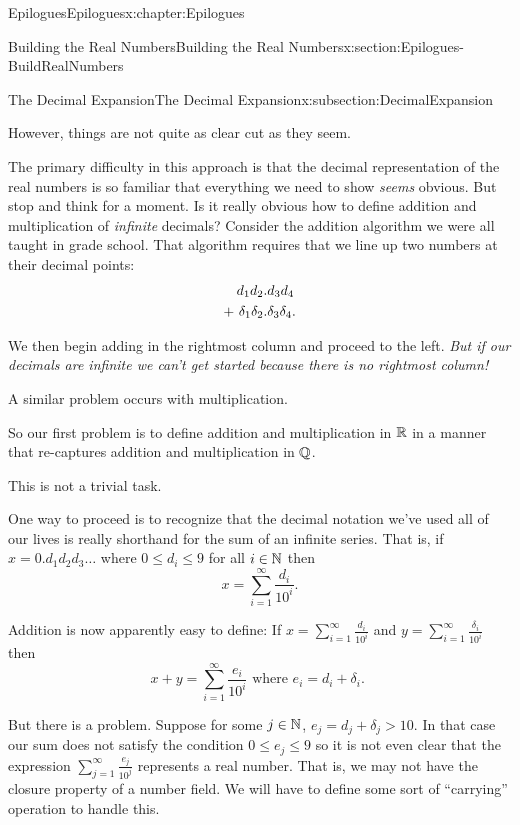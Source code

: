 \begin{chapterptx}{Epilogues}{}{Epilogues}{}{}{x:chapter:Epilogues}
\begin{sectionptx}{Building the Real Numbers}{}{Building the Real Numbers}{}{}{x:section:Epilogues-BuildRealNumbers}
\begin{subsectionptx}{The Decimal Expansion}{}{The Decimal Expansion}{}{}{x:subsection:DecimalExpansion}
			\par
			However, things are not quite as clear cut as they seem.%
			\par
			The primary difficulty in this approach is that the decimal representation of the real numbers is so familiar that everything we need to show \emph{seems} obvious. But stop and think for a moment. Is it really obvious how to define addition and multiplication of \emph{infinite} decimals? Consider the addition algorithm we were all taught in grade school. That algorithm requires that we line up two numbers at their decimal points:%
			\begin{align*}
				d_1d_2& .d_3d_4\\
				+\   \delta_1\delta_2& .\delta_3\delta_4\text{.}
			\end{align*}
			\par
			We then begin adding in the rightmost column and proceed to the left. \emph{But if our decimals are infinite we can't get started because there is no rightmost column!}%
			\par
			A similar problem occurs with multiplication.%
			\par
			So our first problem is to define addition and multiplication in \(\mathbb {R}\) in a manner that re-captures addition and multiplication in \(\mathbb {Q}\).%
			\par
			This is not a trivial task.%
			\par
			One way to proceed is to recognize that the decimal notation we've used all of our lives is really shorthand for the sum of an infinite series. That is, if \(x=0.d_1d_2d_3\ldots\) where \(0\leq d_i\leq 9\) for all \(i\in\mathbb {N}\) then%
			\begin{equation*}
				x=\sum_{i=1}^\infty\frac{d_i}{10^i}\text{.}
			\end{equation*}
			\par
			Addition is now apparently easy to define: If \(x=\sum_{i=1}^\infty\frac{d_i}{10^i}\) and \(y=\sum_{i=1}^\infty\frac{\delta_i}{10^i}\) then%
			\begin{equation*}
				x+y= \sum_{i=1}^\infty\frac{e_i}{10^i} \text{ where \(e_i =d_i+\delta_i\). }
			\end{equation*}
			\par
			But there is a problem. Suppose for some \(j\in\mathbb {N}\), \(e_j=d_j+\delta_j>10\). In that case our sum does not satisfy the condition \(0\leq e_j\leq 9\) so it is not even clear that the expression \(\sum_{j=1}^\infty\frac{e_j}{10^j}\) represents a real number. That is, we may not have the closure property of a number field. We will have to define some sort of ``carrying'' operation to handle this.%

\end{subsectionptx}
\end{sectionptx}
\end{chapterptx}
